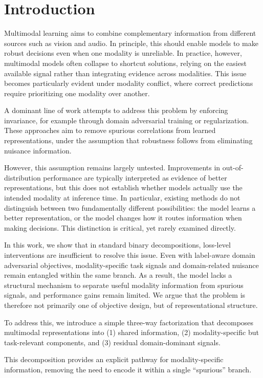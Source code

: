 \documentclass{article}
\begin{document}
\section{Introduction}

Multimodal learning aims to combine complementary information from different sources such as vision and audio. In principle, this should enable models to make robust decisions even when one modality is unreliable. In practice, however, multimodal models often collapse to shortcut solutions, relying on the easiest available signal rather than integrating evidence across modalities. This issue becomes particularly evident under modality conflict, where correct predictions require prioritizing one modality over another.

A dominant line of work attempts to address this problem by enforcing invariance, for example through domain adversarial training or regularization. These approaches aim to remove spurious correlations from learned representations, under the assumption that robustness follows from eliminating nuisance information.

However, this assumption remains largely untested. Improvements in out-of-distribution performance are typically interpreted as evidence of better representations, but this does not establish whether models actually use the intended modality at inference time. In particular, existing methods do not distinguish between two fundamentally different possibilities: the model learns a better representation, or the model changes how it routes information when making decisions. This distinction is critical, yet rarely examined directly.

In this work, we show that in standard binary decompositions, loss-level interventions are insufficient to resolve this issue. Even with label-aware domain adversarial objectives, modality-specific task signals and domain-related nuisance remain entangled within the same branch. As a result, the model lacks a structural mechanism to separate useful modality information from spurious signals, and performance gains remain limited. We argue that the problem is therefore not primarily one of objective design, but of representational structure.

To address this, we introduce a simple three-way factorization that decomposes multimodal representations into (1) shared information, (2) modality-specific but task-relevant components, and (3) residual domain-dominant signals.

This decomposition provides an explicit pathway for modality-specific information, removing the need to encode it within a single ``spurious'' branch.
\end{document}
